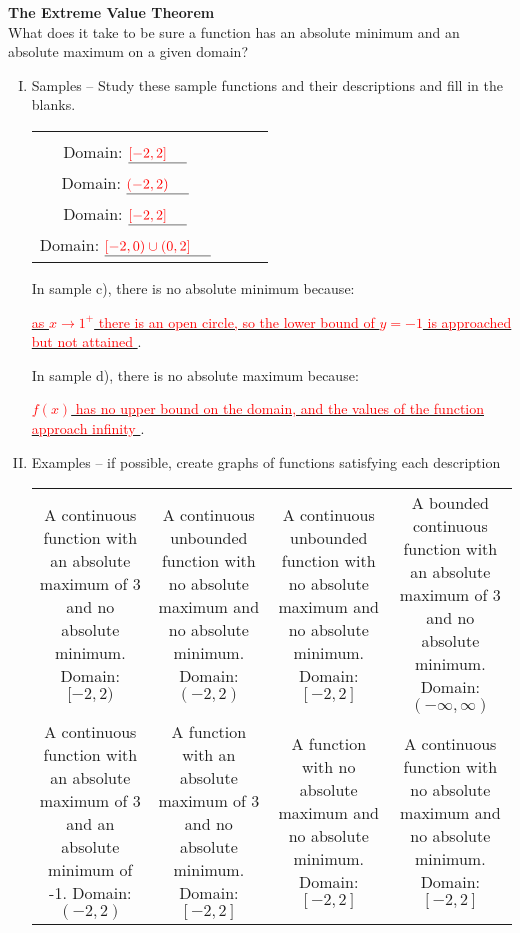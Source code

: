 \documentclass[letterpaper,11pt]{article}
\newcommand{\opsol}{1}
\newcommand{\sol}[1]{\underline{\textcolor{red}{#1} \hspace{.2 in}}}
\newcommand{\opsol}{0}
\newcommand{\sol}[1]{\underline{\textcolor{white}{#1} \hspace{.2 in}}}
\newcommand{\acard}[1]{
\begin{minipage}[l][2.4 in]{1.7 in}
\begin{center}
\begin{tikzpicture}
\begin{axis}[
   	xmin=-2.2, xmax=2.2,
	ymin=-1.2, ymax=3.2,
	major tick length={0},
	line width=1pt,
 	axis lines=center, height=1.8 in, width=1.8 in, grid=major,
 	restrict y to domain=-1:4
	]
    \addplot [opacity=\opsol, red, smooth, very thick, samples=9, domain=-2:2] plot coordinates {(-2,3) (2,1)};
    \addplot [opacity=\opsol, mark=*, only marks, red, very thick] coordinates {(-2,3)};
    \addplot [opacity=\opsol, red, only marks, very thick, mark=*, mark options={scale=1, fill=white}]
    coordinates{(2,1)};
\end{axis}
\end{tikzpicture}

#1
\end{center}
\end{minipage}}
\newcommand{\bcard}[1]{
\begin{minipage}[l][2.4 in]{1.7 in}
\begin{center}
\begin{tikzpicture}
\begin{axis}[
   	xmin=-2.2, xmax=2.2,
	ymin=-1.2, ymax=3.2,
	major tick length={0},
	line width=1pt,
 	axis lines=center, height=1.8 in, width=1.8 in, grid=major,
 	restrict y to domain=-1.1:3.1
	]
    \addplot[<->] [opacity=\opsol, red, very thick, samples=999, domain=-1.9:2] {.5*tan(180/4*x)};
    \addplot [opacity=\opsol, dashed, red, very thick, samples=9, domain=-2:2] plot coordinates {(-2,-1)(-2,3)};
    \addplot [opacity=\opsol, dashed, red, very thick, samples=9, domain=-2:2] plot coordinates {(2,-1)(2,3)};
\end{axis}
\end{tikzpicture}

#1
\end{center}
\end{minipage}}
\newcommand{\ccard}[1]{
\begin{minipage}[l][2.4 in]{1.7 in}
\begin{center}
\begin{tikzpicture}
\begin{axis}[
   	xmin=-2.2, xmax=2.2,
	ymin=-1.2, ymax=3.2,
	major tick length={0},
	line width=1pt,
 	axis lines=center, height=1.8 in, width=1.8 in, grid=major,
 	restrict y to domain=-1.2:3.2
	]
    \node [opacity=\opsol, red, very thick] at (axis cs:0, 1) {Not Possible};
\end{axis}
\end{tikzpicture}

#1
\end{center}
\end{minipage}}
\newcommand{\dcard}[1]{
\begin{minipage}[l][2.4 in]{1.7 in}
\begin{center}
\begin{tikzpicture}
\begin{axis}[
   	xmin=-2.2, xmax=2.2,
	ymin=-1.2, ymax=3.2,
	major tick length={0},
	line width=1pt,
 	axis lines=center, height=1.8 in, width=1.8 in, grid=major,
 	restrict y to domain=-1.2:3.2
	]
    \addplot[<->] [opacity=\opsol, red, smooth, very thick, samples=999, domain=-2:2] {1.867/(.25*sqrt(2*pi))*exp(-((x)^2)/(.25*2^2))};
\end{axis}
\end{tikzpicture}

#1
\end{center}
\end{minipage}}
\newcommand{\ecard}[1]{
\begin{minipage}[l][2.4 in]{1.7 in}
\begin{center}
\begin{tikzpicture}
\begin{axis}[
   	xmin=-2.2, xmax=2.2,
	ymin=-1.2, ymax=3.2,
	major tick length={0},
	line width=1pt,
 	axis lines=center, height=1.8 in, width=1.8 in, grid=major,
 	restrict y to domain=-1.2:3.2
	]
    \addplot [opacity=\opsol, red,,smooth, very thick, samples=99, domain=-2:2] {(8/27)*x^3-2*x+1};
	\addplot [opacity=\opsol, red, only marks, very thick, mark=*, mark options={scale=1, fill=white}]
    coordinates{(2,-17/27 )(-2, 71/27)};
\end{axis}
\end{tikzpicture}

#1
\end{center}
\end{minipage}}
\newcommand{\fcard}[1]{
\begin{minipage}[l][2.4 in]{1.7 in}
\begin{center}
\begin{tikzpicture}
\begin{axis}[
   	xmin=-2.2, xmax=2.2,
	ymin=-1.2, ymax=3.2,
	major tick length={0},
	line width=1pt,
 	axis lines=center, height=1.8 in, width=1.8 in, grid=major,
 	restrict y to domain=-1:4
	]
    \addplot [opacity=\opsol, red, smooth, very thick, samples=9, domain=-2:2] plot coordinates {(-2,1) (1,3)};
    \addplot [opacity=\opsol, red, smooth, very thick, samples=9, domain=-2:2] plot coordinates {(1,-1) (2,1)};
    \addplot [opacity=\opsol, mark=*, only marks, red, very thick] coordinates {(-2,1) (1,3) (2,1)};
    \addplot [opacity=\opsol, red, only marks, very thick, mark=*, mark options={scale=1, fill=white}]
    coordinates{(1,-1)};
\end{axis}
\end{tikzpicture}

#1
\end{center}
\end{minipage}}
\newcommand{\gcard}[1]{
\begin{minipage}[l][2.4 in]{1.7 in}
\begin{center}
\begin{tikzpicture}
\begin{axis}[
   	xmin=-2.2, xmax=2.2,
	ymin=-1.2, ymax=3.2,
	major tick length={0},
	line width=1pt,
 	axis lines=center, height=1.8 in, width=1.8 in, grid=major,
 	restrict y to domain=-1:4
	]
    \addplot [opacity=\opsol, red, smooth, very thick, samples=9, domain=-2:2] plot coordinates {(-2,1) (1,3)};
    \addplot [opacity=\opsol, red, smooth, very thick, samples=9, domain=-2:2] plot coordinates {(1,-1) (2,1)};
    \addplot [opacity=\opsol, mark=*, only marks, red, very thick] coordinates {(-2,1) (1,1) (2,1)};
    \addplot [opacity=\opsol, red, only marks, very thick, mark=*, mark options={scale=1, fill=white}]
    coordinates{(1,3) (1,-1)};
\end{axis}
\end{tikzpicture}

#1
\end{center}
\end{minipage}}
\newcommand{\carda}{
\begin{minipage}[l][2.8 in]{1.7 in}
a)
\vspace{-.3 in}
\begin{center}
\begin{tikzpicture}
\begin{axis}[
   	xmin=-2.2, xmax=2.2,
	ymin=-1.2, ymax=3.2,
	major tick length={0},
	line width=1pt,
 	axis lines=center, height=1.8 in, width=1.8 in, grid=major,
 	restrict y to domain=-1:4
	]
    \addplot [smooth, very thick, samples=99, domain=-2:2] {(8/27)*x^3+(8/18)*x^2-(16/9)*x+1/27};
    \addplot [mark=*, only marks, black, very thick] coordinates {(-2,3) (2,17/27)};
\end{axis}
\end{tikzpicture}

A continuous function with an absolute maximum of \sol{3} at $x=\sol{-2}$ and an absolute minimum of $\sol{-1}$ at $x=\sol{1}$. \\ Domain: $\sol{[-2,2]}$
\end{center}
\end{minipage}}
\newcommand{\cardb}{
\begin{minipage}[l][2.8 in]{1.7 in}
b)
\vspace{-.3 in}
\begin{center}
\begin{tikzpicture}
\begin{axis}[
   	xmin=-2.2, xmax=2.2,
	ymin=-1.2, ymax=3.2,
	major tick length={0},
	line width=1pt,
 	axis lines=center, height=1.8 in, width=1.8 in, grid=major,
 	restrict y to domain=-1:4
	]
    \addplot [mark=*, smooth, black, very thick] coordinates {(-2,2) (2,1)};
    \addplot [black, only marks, very thick, mark=*, mark options={scale=1, fill=white}]
    coordinates{(-2,2) (2,1)};
\end{axis}
\end{tikzpicture}

A continuous function with no absolute maximum and no absolute minimum. \\ Domain: $\sol{(-2,2)}$
\end{center}
\end{minipage}}
\newcommand{\cardc}{
\begin{minipage}[l][2.8 in]{1.7 in}
c)
\vspace{-.3 in}
\begin{center}
\begin{tikzpicture}
\begin{axis}[
   	xmin=-2.2, xmax=2.2,
	ymin=-1.2, ymax=3.2,
	major tick length={0},
	line width=1pt,
 	axis lines=center, height=1.8 in, width=1.8 in, grid=major,
 	restrict y to domain=-1:3
	]
	\addplot [smooth, very thick, samples=99, domain=-2:2] {-2*x^2+(8)*x-7};
	\addplot [smooth, very thick, samples=99, domain=-2:2] {(2/9)*x^2+(8/9)*x+17/9};
	\addplot [mark=*, only marks, black, very thick] coordinates {(-2,1) (1,3) (2,1)};
	\addplot [black, only marks, very thick, mark=*, mark options={scale=1, fill=white}]
    coordinates{(1,-1)};
\end{axis}
\end{tikzpicture}

A discontinuous function with an absolute maximum of $\sol{3}$ at $x=\sol{1}$ and no absolute minimum. \\ Domain: $\sol{[-2,2]}$
\end{center}
\end{minipage}}
\newcommand{\cardd}{
\begin{minipage}[l][2.8 in]{1.7 in}
d)
\vspace{-.3 in}
\begin{center}
\begin{tikzpicture}
\begin{axis}[
   	xmin=-2.2, xmax=2.2,
	ymin=-1.2, ymax=3.2,
	major tick length={0},
	line width=1pt,
 	axis lines=center, height=1.8 in, width=1.8 in, grid=major,
 	restrict y to domain=-1.2:3.2
	]
    \addplot[<-] [very thick, samples=999, domain=0:2] {1/(10*x)+1};
    \addplot[->] [very thick, samples=999, domain=-2:0] {1/(10*x)};
	\addplot [mark=*, only marks, black, very thick] coordinates {(-2,0) (2,1)};
\end{axis}
\end{tikzpicture}

An unbounded discontinuous function with no absolute maximum and no absolute minimum. \\ Domain: $\sol{[-2,0) \cup (0,2]}$
\end{center}
\end{minipage}}
\begin{document}


{\large \textbf{The Extreme Value Theorem}} \\
What does it take to be sure a function has an absolute minimum and an absolute maximum on a given domain?
\begin{enumerate}[I.]%
\item Samples -- Study these sample functions and their descriptions and fill in the blanks.

\begin{tabular}{c|c|c|c}
\carda & \cardb & \cardc & \cardd \\
\end{tabular}

\begin{spacing}{1.25}
In sample c), there is no absolute minimum because: 

\sol{as $x \rightarrow 1^+$ there is an open circle, so the lower bound of $y=-1$ is approached but not attained}.

In sample d), there is no absolute maximum because: 

\sol{$f(x)$ has no upper bound on the domain, and the values of the function approach infinity \hspace{.35 in}}.
\end{spacing}

\vspace{-.1 in}
\item Examples -- if possible, create graphs of functions satisfying each description

\begin{center}
\begin{tabular}{c|c|c|c}
\acard{A continuous function with an absolute maximum of 3 and no absolute minimum. \\ Domain: $[-2,2)$} & \bcard{A continuous unbounded function with no absolute maximum and no absolute minimum. \\ Domain: $(-2,2)$} & \ccard{A continuous unbounded function with no absolute maximum and no absolute minimum. \\ Domain: $[-2,2]$} & \dcard{A bounded continuous function with an absolute maximum of 3 and no absolute minimum. \\ Domain: $(-\infty,\infty)$} \\
\ecard{A continuous function with an absolute maximum of 3 and an absolute minimum of -1. \\ Domain: $(-2,2)$} & \fcard{A function with an absolute maximum of 3 and no absolute minimum. \\ Domain: $[-2,2]$} & \gcard{A function with no absolute maximum and no absolute minimum. \\ Domain: $[-2,2]$} & \ccard{A continuous function with no absolute maximum and no absolute minimum. \\ Domain: $[-2,2]$}
\end{tabular}
\end{center}


\end{enumerate}
\end{document}

